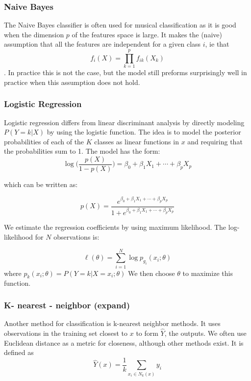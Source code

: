 \documentclass[12pt,twoside]{reedthesis}
\theoremstyle{definition}
\theoremstyle{definition}
\theoremstyle{definition}
\theoremstyle{remark}
\begin{document}
\subsubsection{Naive Bayes}\label{naive-bayes}

The Naive Bayes classifier is often used for musical classification as
it is good when the dimension \(p\) of the features space is large. It
makes the (naive) assumption that all the features are independent for a
given class \(i\), ie that \[f_i(X) = \prod_{k = 1}^p f_{ik}(X_k)\]. In
practice this is not the case, but the model still preforms surprisingly
well in practice when this assumption does not hold.

\subsubsection{Logistic Regression}\label{logistic-regression}

Logistic regression differs from linear discriminant analysis by
directly modeling \(P(Y = k|X)\) by using the logistic function. The
idea is to model the posterior probabilities of each of the \(K\)
classes as linear functions in \(x\) and requiring that the
probabilities sum to 1. The model has the form:
\[ \log \bigg( \frac{p(X)}{1-p(X)} \bigg) = \beta_0 + \beta_1 X_1 + \cdots + \beta_pX_p\]

which can be written as:

\[ p(X) = \frac{e^{\beta_0 + \beta_1X_1 + \cdots + \beta_pX_p}}{1 +e^{\beta_0 + \beta_1X_1 + \cdots + \beta_pX_p} }\]

We estimate the regression coefficients by using maximum likelihood. The
log-likelihood for \(N\) observations is:

\[ \ell(\theta) = \sum_{i = 1}^N \log p_{g_i}(x_i;\theta)\] where
\(p_k(x_i;\theta) = P(Y = k|X = x_i;\theta)\) We then choose \(\theta\)
to maximize this function.

\subsubsection{K- nearest - neighbor
(expand)}\label{k--nearest---neighbor-expand}

Another method for classification is k-nearest neighbor methods. It uses
observations in the training set closest to \(x\) to form \(\hat{Y}\),
the outputs. We often use Euclidean distance as a metric for closeness,
although other methods exist. It is defined as
\[ \hat{Y}(x) = \frac{1}{k}\sum_{x_i \in N_k(x)}y_i\]
\end{document}
